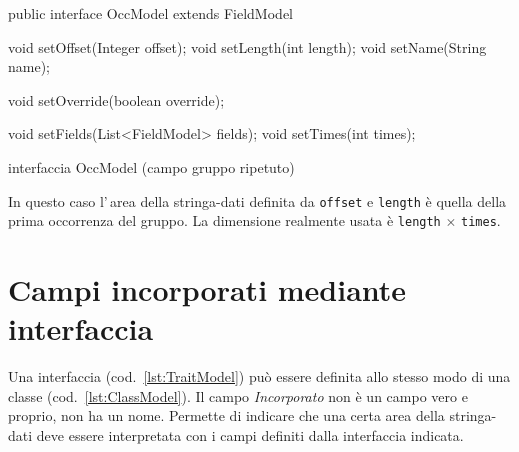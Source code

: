 \documentclass[a4paper,10pt]{report}
\newif\ifesource
\newenvironment{elisting}[1][H]
  {\captionsetup{aboveskip=0pt}\begin{listing}[#1]}
  {\end{listing}%
}
\begin{document}
\ifesource
\begin{figure*}[!htb]
\begin{lstlisting}[language=java, 
caption=interfaccia OccModel (campo gruppo ripetuto), 
label=lst:OccModel]
public interface OccModel extends  FieldModel {
    void setOffset(Integer offset);
    void setLength(int length);
    void setName(String name);
    
    void setOverride(boolean override);
    
    void setFields(List<FieldModel> fields);
    void setTimes(int times);
}
\end{lstlisting}\index{OccModel}
\end{figure*}
\else
\begin{elisting}[!htb]
\begin{javacode}
public interface OccModel extends  FieldModel {
    void setOffset(Integer offset);
    void setLength(int length);
    void setName(String name);
    
    void setOverride(boolean override);
    
    void setFields(List<FieldModel> fields);
    void setTimes(int times);
}
\end{javacode}
\caption{interfaccia OccModel (campo gruppo ripetuto)}
\label{lst:OccModel}
\end{elisting}
\fi

In questo caso l'\,area della stringa-dati definita da \verb!offset! e 
\verb!length! è quella della prima occorrenza del gruppo. La dimensione realmente
usata è \verb!length! $\times$ \verb!times!.

\section{Campi incorporati mediante interfaccia}
Una interfaccia (cod.~\ref{lst:TraitModel}) può essere definita allo stesso modo
di una classe (cod.~\ref{lst:ClassModel}).
Il campo \textsl{Incorporato} non è un campo vero e proprio, non ha un nome.
Permette di indicare che una certa area della stringa-dati deve essere 
interpretata con i campi definiti dalla interfaccia indicata.
\end{document}
